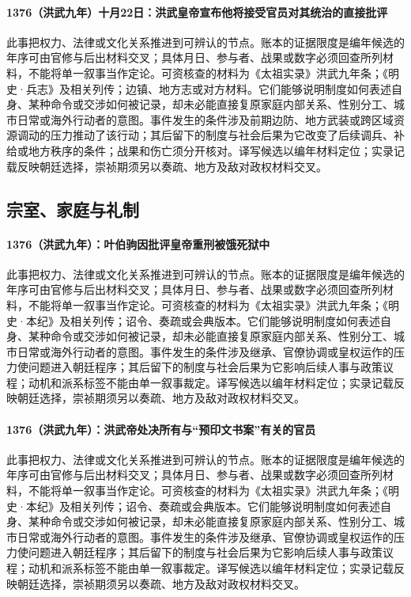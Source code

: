 \paragraph{1376（洪武九年）十月22日：洪武皇帝宣布他将接受官员对其统治的直接批评} 此事把权力、法律或文化关系推进到可辨认的节点。账本的证据限度是编年候选的年序可由官修与后出材料交叉；具体月日、参与者、战果或数字必须回查所列材料，不能将单一叙事当作定论。可资核查的材料为《太祖实录》洪武九年条；《明史·兵志》及相关列传；边镇、地方志或对方材料。它们能够说明制度如何表述自身、某种命令或交涉如何被记录，却未必能直接复原家庭内部关系、性别分工、城市日常或海外行动者的意图。事件发生的条件涉及前期边防、地方武装或跨区域资源调动的压力推动了该行动；其后留下的制度与社会后果为它改变了后续调兵、补给或地方秩序的条件；战果和伤亡须分开核对。译写候选以编年材料定位；实录记载反映朝廷选择，崇祯期须另以奏疏、地方及敌对政权材料交叉。

\subsection{宗室、家庭与礼制}

\paragraph{1376（洪武九年）：叶伯驹因批评皇帝重刑被饿死狱中} 此事把权力、法律或文化关系推进到可辨认的节点。账本的证据限度是编年候选的年序可由官修与后出材料交叉；具体月日、参与者、战果或数字必须回查所列材料，不能将单一叙事当作定论。可资核查的材料为《太祖实录》洪武九年条；《明史·本纪》及相关列传；诏令、奏疏或会典版本。它们能够说明制度如何表述自身、某种命令或交涉如何被记录，却未必能直接复原家庭内部关系、性别分工、城市日常或海外行动者的意图。事件发生的条件涉及继承、官僚协调或皇权运作的压力使问题进入朝廷程序；其后留下的制度与社会后果为它影响后续人事与政策议程；动机和派系标签不能由单一叙事裁定。译写候选以编年材料定位；实录记载反映朝廷选择，崇祯期须另以奏疏、地方及敌对政权材料交叉。

\paragraph{1376（洪武九年）：洪武帝处决所有与“预印文书案”有关的官员} 此事把权力、法律或文化关系推进到可辨认的节点。账本的证据限度是编年候选的年序可由官修与后出材料交叉；具体月日、参与者、战果或数字必须回查所列材料，不能将单一叙事当作定论。可资核查的材料为《太祖实录》洪武九年条；《明史·本纪》及相关列传；诏令、奏疏或会典版本。它们能够说明制度如何表述自身、某种命令或交涉如何被记录，却未必能直接复原家庭内部关系、性别分工、城市日常或海外行动者的意图。事件发生的条件涉及继承、官僚协调或皇权运作的压力使问题进入朝廷程序；其后留下的制度与社会后果为它影响后续人事与政策议程；动机和派系标签不能由单一叙事裁定。译写候选以编年材料定位；实录记载反映朝廷选择，崇祯期须另以奏疏、地方及敌对政权材料交叉。

